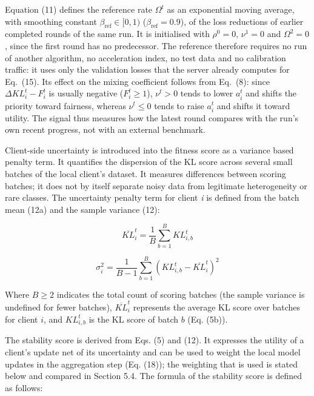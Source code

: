 \documentclass[pdflatex,sn-mathphys-num,oneside]{sn-jnl}%
\theoremstyle{thmstyleone}%
\theoremstyle{thmstyletwo}%
\theoremstyle{thmstylethree}%
\begin{document}
Equation (11) defines the reference rate $\Omega^t$ as an exponential moving average, with smoothing constant $\beta_{\text{ref}}\in[0,1)$ ($\beta_{\text{ref}}=0.9$), of the loss reductions of earlier completed rounds of the same run. It is initialised with $\rho^{0}=0$, $\nu^{1}=0$ and $\Omega^{2}=0$, since the first round has no predecessor. The reference therefore requires no run of another algorithm, no acceleration index, no test data and no calibration traffic: it uses only the validation losses that the server already computes for Eq.~(15). Its effect on the mixing coefficient follows from Eq.~(8): since $\Delta KL_i^t - F_i^t$ is usually negative ($F_i^t\ge 1$), $\nu^t>0$ tends to lower $a_i^t$ and shifts the priority toward fairness, whereas $\nu^t\le 0$ tends to raise $a_i^t$ and shifts it toward utility. The signal thus measures how the latest round compares with the run's own recent progress, not with an external benchmark.

Client-side uncertainty is introduced into the fitness score as a variance based penalty term. It quantifies the dispersion of the KL score across several small batches of the local client's dataset. It measures differences between scoring batches; it does not by itself separate noisy data from legitimate heterogeneity or rare classes. The uncertainty penalty term for client \textit{i} is defined from the batch mean (12a) and the sample variance (12):

\begin{equation}
\overline{KL}_i^t = \frac{1}{B}\sum_{b=1}^{B} KL_{i,b}^t
\tag{12a}
\end{equation}

\begin{equation}
\sigma_i^2 = \frac{1}{B-1} \sum_{b=1}^{B} \left( KL_{i,b}^t - \overline{KL}_i^t \right)^2
\label{eq:variance}
\end{equation}

Where $B\ge 2$ indicates the total count of scoring batches (the sample variance is undefined for fewer batches), $\overline{KL}_i^t$ represents the average KL score over batches for client $i$, and $KL_{i,b}^t$ is the KL score of batch $b$ (Eq. (5b)).

The stability score is derived from Eqs. (5) and (12). It expresses the utility of a client's update net of its uncertainty and can be used to weight the local model updates in the aggregation step (Eq. (18)); the weighting that is used is stated below and compared in Section 5.4. The formula of the stability score is defined as follows:
\end{document}
